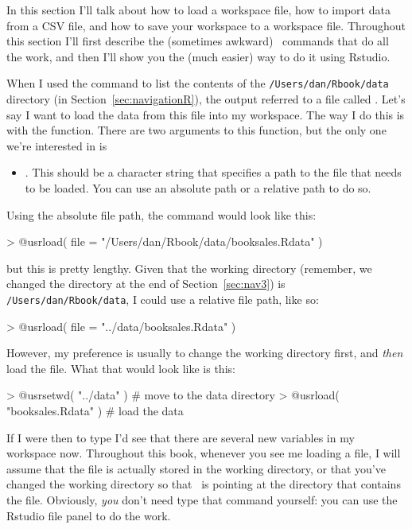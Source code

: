 In this section I'll talk about how to load a workspace file, how to import data from a CSV file, and how to save your workspace to a workspace file. Throughout this section I'll first describe the (sometimes awkward) \R\ commands that do all the work, and then I'll show you the (much easier) way to do it using Rstudio.




When I used the  command to list the contents of the \verb#/Users/dan/Rbook/data# directory (in Section~\ref{sec:navigationR}), the output referred to a file called . Let's say I want to load the data from this file into my workspace. The way I do this is with the  function. There are two arguments to this function, but the only one we're interested in is
\begin{itemize}
\item {}. This should be a character string that specifies a path to the file that needs to be loaded. You can use an absolute path or a relative path to do so.
\end{itemize}
Using the absolute file path, the command would look like this:
\begin{rblock1}
> @usr{load( file = "/Users/dan/Rbook/data/booksales.Rdata" )}
\end{rblock1}
but this is pretty lengthy. Given that the working directory (remember, we changed the directory at the end of Section~\ref{sec:nav3}) is \verb#/Users/dan/Rbook/data#, I could use a relative file path, like so:
\begin{rblock1}
> @usr{load( file = "../data/booksales.Rdata" )}
\end{rblock1}
However, my preference is usually to change the working directory first, and {\it then} load the file. What that would look like is this:
\begin{rblock1}
> @usr{setwd( "../data" )}         # move to the data directory
> @usr{load( "booksales.Rdata" )}  # load the data
\end{rblock1}
If I were then to type  I'd see that there are several new variables in my workspace now.  Throughout this book, whenever you see me loading a file, I will assume that the file is actually stored in the working directory, or that you've changed the working directory so that \R\ is pointing at the directory that contains the file. Obviously, {\it you} don't need type that command yourself: you can use the Rstudio file panel to do the work.

